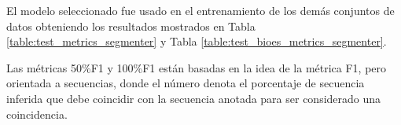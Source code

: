 \documentclass[a4paper,11pt,twocolumn,twoside]{article}
\begin{document}




El modelo seleccionado fue usado en el entrenamiento de los demás conjuntos de datos obteniendo los resultados mostrados
en Tabla \ref{table:test_metrics_segmenter} y Tabla \ref{table:test_bioes_metrics_segmenter}.

Las métricas 50\%F1 y 100\%F1 \cite{persing2016end} están
basadas en la idea de la métrica F1, pero orientada a secuencias, donde el número denota el porcentaje de secuencia inferida que debe coincidir con 
la secuencia anotada para ser considerado una coincidencia.
\end{document}
